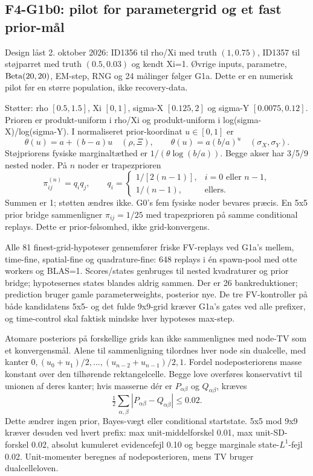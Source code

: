 \subsection{F4-G1b0: pilot for parametergrid og et fast prior-mål}
Design låst 2. oktober 2026: ID1356 til rho/Xi med truth \((1,0.75)\),
ID1357 til støjparret med truth \((0.5,0.03)\) og kendt Xi=1. Øvrige inputs,
parametre, \(\operatorname{Beta}(20,20)\), EM-step, RNG og 24 målinger følger G1a.
Dette er en numerisk pilot før en større population, ikke recovery-data.

Støtter: rho \([0.5,1.5]\), Xi \([0,1]\), sigma-X \([0.125,2]\)
og sigma-Y \([0.0075,0.12]\). Prioren er produkt-uniform i rho/Xi og
produkt-uniform i log(sigma-X)/log(sigma-Y). I normaliseret prior-koordinat
\(u\in[0,1]\) er
\[
 \theta(u)=a+(b-a)u\quad(\rho,\Xi),\qquad
 \theta(u)=a(b/a)^u\quad(\sigma_X,\sigma_Y).
\]
Støjpriorens fysiske marginaltæthed er \(1/(\theta\log(b/a))\).
Begge akser har 3/5/9 nested noder. På \(n\) noder er trapezprioren
\[
 \pi_{ij}^{(n)}=q_iq_j,\qquad
 q_i=\begin{cases}1/[2(n-1)],&i=0\text{ eller }n-1,\\
                  1/(n-1),&\text{ellers.}\end{cases}
\]
Summen er 1; støtten ændres ikke. G0's fem fysiske noder bevares præcis.
En 5x5 prior bridge sammenligner \(\pi_{ij}=1/25\) med trapezprioren på
samme conditional replays. Dette er prior-følsomhed, ikke grid-konvergens.

Alle 81 finest-grid-hypoteser gennemfører friske FV-replays ved G1a's mellem,
time-fine, spatial-fine og quadrature-fine: 648 replays i én spawn-pool med
otte workers og BLAS=1. Scores/states genbruges til nested kvadraturer og
prior bridge; hypotesernes states blandes aldrig sammen. Der er 26
bankreduktioner; prediction bruger gamle parameterweights, posterior nye.
De tre FV-kontroller på både kandidatens 5x5- og det fulde 9x9-grid kræver
G1a's gates ved alle prefixer,
og time-control skal faktisk mindske hver hypoteses max-step.

Atomare posteriors på forskellige grids kan ikke sammenlignes med node-TV
som et konvergensmål. Alene til sammenligning tilordnes hver node sin
dualcelle, med kanter \(0,(u_0+u_1)/2,\ldots,(u_{n-2}+u_{n-1})/2,1\).
Fordel nodeposteriorens masse konstant over den tilhørende rektangelcelle.
Begge love overføres konservativt til unionen af deres kanter; hvis masserne
dér er \(P_{\alpha\beta}\) og \(Q_{\alpha\beta}\), kræves
\[
 \tfrac12\sum_{\alpha,\beta}|P_{\alpha\beta}-Q_{\alpha\beta}|\le0.02.
\]
Dette ændrer ingen prior, Bayes-vægt eller conditional startstate.
5x5 mod 9x9 kræver desuden ved hvert prefix: max unit-middelforskel 0.01,
max unit-SD-forskel 0.02, absolut kumuleret evidencefejl 0.10 og begge
marginale state-\(L^1\)-fejl 0.02. Unit-momenter beregnes af nodeposterioren,
mens TV bruger dualcelleloven.


